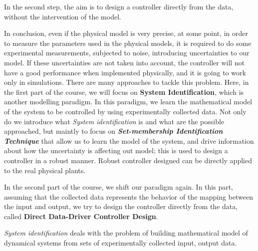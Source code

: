    In the second step, the aim is to design a controller directly from the data, without the intervention of the model.


\begin{factbox}

    In conclusion, even if the physical model is very precise, at some point, in order to measure the parameters used in the physical models, it is required to do some experimental measurements, subjected to noise, introducing uncertainties to our model.\newline \newline
    If these uncertainties are not taken into account, the controller will not have a good performance when implemented physically, and it is going to work only in simulations. \newline \newline
    There are many approaches to tackle this problem. Here, in the first part of the course, we will focus on \textbf{System Identification}, which is another modelling paradigm. In this paradigm, we learn the mathematical model of the system to be controlled by using experimentally collected data. Not only do we introduce what \textit{System identification} is and what are the possible approached, but maintly to focus on \textbf{\textit{Set-membership Identification Technique}} that allow us to learn the model of the system, and drive information about how the uncertainty is affecting out model; this is used to design a controller in a robust manner. Robust controller designed can be directly applied to the real physical plants.  \newline \newline
    
    In the second part of the course, we shift our paradigm again. In this part, assuming that the collected data represents the behavior of the mapping between the input and output, we try to design the controller directly from the data, called  \textbf{Direct Data-Driver Controller Design}. \newline \newline
    
\end{factbox}

\textit{System identification} deals with the problem of building mathematical model of dynamical systems from sets of experimentally collected input, output data.


